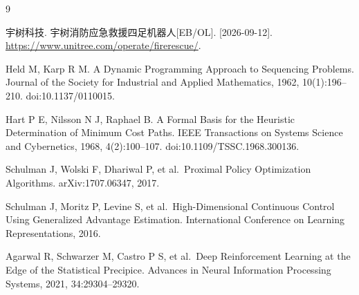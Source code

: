 \begin{thebibliography}{9}
\small\setlength{\itemsep}{8pt}

 \begingroup\raggedright
 宇树科技. 宇树消防应急救援四足机器人[EB/OL]. [2026-09-12]. \url{https://www.unitree.com/operate/firerescue/}.
 \par\endgroup

 Held M, Karp R M. A Dynamic Programming Approach to Sequencing Problems. Journal of the Society for Industrial and Applied Mathematics, 1962, 10(1):196--210. doi:10.1137/0110015.

 Hart P E, Nilsson N J, Raphael B. A Formal Basis for the Heuristic Determination of Minimum Cost Paths. IEEE Transactions on Systems Science and Cybernetics, 1968, 4(2):100--107. doi:10.1109/TSSC.1968.300136.

 Schulman J, Wolski F, Dhariwal P, et al.~Proximal Policy Optimization Algorithms. arXiv:1707.06347, 2017.

 Schulman J, Moritz P, Levine S, et al.~High-Dimensional Continuous Control Using Generalized Advantage Estimation. International Conference on Learning Representations, 2016.

 Agarwal R, Schwarzer M, Castro P S, et al.~Deep Reinforcement Learning at the Edge of the Statistical Precipice. Advances in Neural Information Processing Systems, 2021, 34:29304--29320.

\end{thebibliography}



\clearpage


